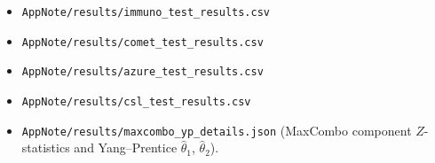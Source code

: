 \documentclass[11pt]{article}
\begin{document}
\begin{itemize}
  \item \texttt{AppNote/results/immuno\_test\_results.csv}
  \item \texttt{AppNote/results/comet\_test\_results.csv}
  \item \texttt{AppNote/results/azure\_test\_results.csv}
  \item \texttt{AppNote/results/csl\_test\_results.csv}
  \item \texttt{AppNote/results/maxcombo\_yp\_details.json}
        (MaxCombo component $Z$-statistics and Yang--Prentice
        $\hat\theta_1$, $\hat\theta_2$).
\end{itemize}



\end{document}
